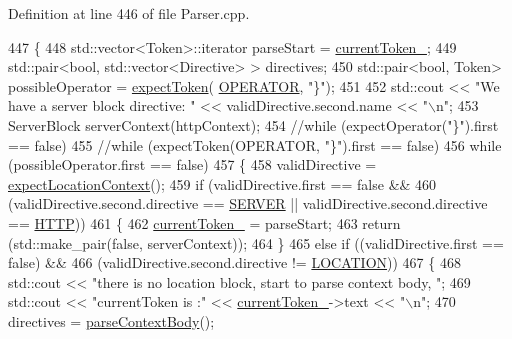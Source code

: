 Definition at line 446 of file Parser.\+cpp.


\begin{DoxyCode}
447     \{
448         std::vector<Token>::iterator parseStart = \hyperlink{classft_1_1_parser_a942c5b794d108f144c5b5028aaa34cb6}{currentToken\_};
449         std::pair<bool, std::vector<Directive> > directives;
450         std::pair<bool, Token> possibleOperator = \hyperlink{classft_1_1_parser_a1615a752d3642bb53598e2c8db810db0}{expectToken}(
      \hyperlink{namespaceft_aa520fbf142ba1e7e659590c07da31921a6411d9d6073252e4d316493506bbb979}{OPERATOR}, \textcolor{stringliteral}{"\}"});
451 
452         std::cout << \textcolor{stringliteral}{"We have a server block directive: "} << validDirective.second.name << \textcolor{stringliteral}{"\(\backslash\)n"};
453         ServerBlock serverContext(httpContext);
454         \textcolor{comment}{//while (expectOperator("\}").first == false)}
455         \textcolor{comment}{//while (expectToken(OPERATOR, "\}").first == false)}
456         \textcolor{keywordflow}{while} (possibleOperator.first == \textcolor{keyword}{false})
457         \{
458             validDirective = \hyperlink{classft_1_1_parser_a002b236022851df6ef2203aab9b24a73}{expectLocationContext}();
459             \textcolor{keywordflow}{if} (validDirective.first == \textcolor{keyword}{false} &&
460                  (validDirective.second.directive == \hyperlink{namespaceft_a5a5554dff10f0dc50bae4cc5825ad75da67c96b24b23bcb408bae7626730a04b7}{SERVER} || validDirective.second.directive == 
      \hyperlink{namespaceft_a5a5554dff10f0dc50bae4cc5825ad75da67e044074f46e6cea22788527da5f02e}{HTTP}))
461             \{
462                 \hyperlink{classft_1_1_parser_a942c5b794d108f144c5b5028aaa34cb6}{currentToken\_} = parseStart;
463                 \textcolor{keywordflow}{return} (std::make\_pair(\textcolor{keyword}{false}, serverContext));
464             \}
465             \textcolor{keywordflow}{else} \textcolor{keywordflow}{if} ((validDirective.first == \textcolor{keyword}{false}) &&
466                      (validDirective.second.directive != \hyperlink{namespaceft_a5a5554dff10f0dc50bae4cc5825ad75da1e9e3944b93fde52c7c92e1e15dcaf4a}{LOCATION}))
467             \{
468                 std::cout << \textcolor{stringliteral}{"there is no location block, start to parse context body, "};
469                 std::cout << \textcolor{stringliteral}{"currentToken is :"} << \hyperlink{classft_1_1_parser_a942c5b794d108f144c5b5028aaa34cb6}{currentToken\_}->text << \textcolor{stringliteral}{"\(\backslash\)n"};
470                 directives = \hyperlink{classft_1_1_parser_aa8d68b83134b46e4b9115d9acd0cbf57}{parseContextBody}();

\end{DoxyCode}
